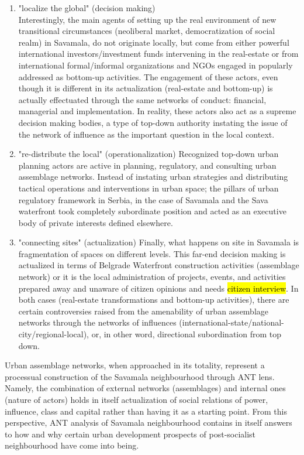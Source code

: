 \documentclass[11pt]{report}
\begin{document}
\begin{enumerate}
\item "localize the global" (decision making)
\\
Interestingly, the main agents of setting up the real environment of new transitional circumstances (neoliberal market, democratization of social realm) in Savamala, do not originate locally, but come from either powerful international investors/investment funds intervening in the real-estate or from international formal/informal organizations and NGOs engaged in popularly addressed as bottom-up activities.
The engagement of these actors, even though it is different in its actualization (real-estate and bottom-up) is actually effectuated through the same networks of conduct: financial, managerial and implementation.
In reality, these actors also act as a supreme decision making bodies, a type of top-down authority instating the issue of the network of influence as the important question in  the local context. 
\item "re-distribute the local" (operationalization)
Recognized top-down urban planning actors are active in planning, regulatory, and consulting urban assemblage networks. Instead of instating urban strategies and distributing tactical operations and interventions in urban space; the pillars of urban regulatory framework in Serbia, in the case of Savamala and the Sava waterfront took completely subordinate position and acted as an executive body of private interests defined elsewhere.
\item "connecting sites" (actualization)
Finally, what happens on site in Savamala is fragmentation of spaces on different levels.
This far-end decision making is actualized in terms of Belgrade Waterfront construction activities (assemblage network) or it is the local administration of projects, events, and activities prepared away and unaware of citizen opinions and needs \hl{citizen interview}.
In both cases (real-estate transformations and bottom-up activities), there are certain controversies raised from the amenability of urban assemblage networks through the networks of influences (international-state/national-city/regional-local), or, in other word, directional subordination from top down.
\end{enumerate}

Urban assemblage networks, when approached in its totality, represent a processual construction of the Savamala neighbourhood through ANT lens. Namely, the combination of external networks (assemblages) and internal ones (nature of actors) holds in itself actualization of social relations of power, influence, class and capital rather than having it as a starting point.
From this perspective, ANT analysis of Savamala neighbourhood contains in itself answers to how and why certain urban development prospects of post-socialist neighbourhood have come into being.
\end{document}
